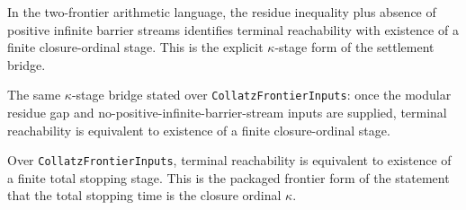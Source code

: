 \begin{theorem}
  \label{thm:collatz-residue-no-infinite-stream-kappa-stage}
  \leanok
  In the two-frontier arithmetic language, the residue inequality plus absence of
  positive infinite barrier streams identifies terminal reachability with existence
  of a finite closure-ordinal stage. This is the explicit \(\kappa\)-stage form of
  the settlement bridge.
\end{theorem}

\begin{theorem}
  \label{thm:collatz-frontier-inputs-kappa-stage}
  \leanok
  The same \(\kappa\)-stage bridge stated over \texttt{CollatzFrontierInputs}: once
  the modular residue gap and no-positive-infinite-barrier-stream inputs are supplied,
  terminal reachability is equivalent to existence of a finite closure-ordinal stage.
\end{theorem}

\begin{theorem}
  \label{thm:collatz-frontier-inputs-total-stopping-stage}
  \leanok
  Over \texttt{CollatzFrontierInputs}, terminal reachability is equivalent to
  existence of a finite total stopping stage. This is the packaged frontier form
  of the statement that the total stopping time is the closure ordinal \(\kappa\).
\end{theorem}

